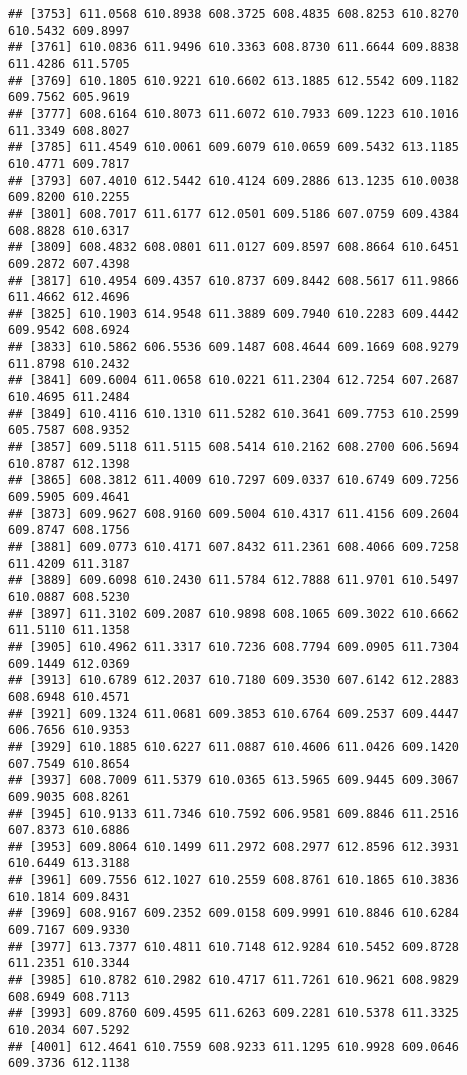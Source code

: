 \documentclass[
]{article}
\begin{document}
\begin{verbatim}
## [3753] 611.0568 610.8938 608.3725 608.4835 608.8253 610.8270 610.5432 609.8997
## [3761] 610.0836 611.9496 610.3363 608.8730 611.6644 609.8838 611.4286 611.5705
## [3769] 610.1805 610.9221 610.6602 613.1885 612.5542 609.1182 609.7562 605.9619
## [3777] 608.6164 610.8073 611.6072 610.7933 609.1223 610.1016 611.3349 608.8027
## [3785] 611.4549 610.0061 609.6079 610.0659 609.5432 613.1185 610.4771 609.7817
## [3793] 607.4010 612.5442 610.4124 609.2886 613.1235 610.0038 609.8200 610.2255
## [3801] 608.7017 611.6177 612.0501 609.5186 607.0759 609.4384 608.8828 610.6317
## [3809] 608.4832 608.0801 611.0127 609.8597 608.8664 610.6451 609.2872 607.4398
## [3817] 610.4954 609.4357 610.8737 609.8442 608.5617 611.9866 611.4662 612.4696
## [3825] 610.1903 614.9548 611.3889 609.7940 610.2283 609.4442 609.9542 608.6924
## [3833] 610.5862 606.5536 609.1487 608.4644 609.1669 608.9279 611.8798 610.2432
## [3841] 609.6004 611.0658 610.0221 611.2304 612.7254 607.2687 610.4695 611.2484
## [3849] 610.4116 610.1310 611.5282 610.3641 609.7753 610.2599 605.7587 608.9352
## [3857] 609.5118 611.5115 608.5414 610.2162 608.2700 606.5694 610.8787 612.1398
## [3865] 608.3812 611.4009 610.7297 609.0337 610.6749 609.7256 609.5905 609.4641
## [3873] 609.9627 608.9160 609.5004 610.4317 611.4156 609.2604 609.8747 608.1756
## [3881] 609.0773 610.4171 607.8432 611.2361 608.4066 609.7258 611.4209 611.3187
## [3889] 609.6098 610.2430 611.5784 612.7888 611.9701 610.5497 610.0887 608.5230
## [3897] 611.3102 609.2087 610.9898 608.1065 609.3022 610.6662 611.5110 611.1358
## [3905] 610.4962 611.3317 610.7236 608.7794 609.0905 611.7304 609.1449 612.0369
## [3913] 610.6789 612.2037 610.7180 609.3530 607.6142 612.2883 608.6948 610.4571
## [3921] 609.1324 611.0681 609.3853 610.6764 609.2537 609.4447 606.7656 610.9353
## [3929] 610.1885 610.6227 611.0887 610.4606 611.0426 609.1420 607.7549 610.8654
## [3937] 608.7009 611.5379 610.0365 613.5965 609.9445 609.3067 609.9035 608.8261
## [3945] 610.9133 611.7346 610.7592 606.9581 609.8846 611.2516 607.8373 610.6886
## [3953] 609.8064 610.1499 611.2972 608.2977 612.8596 612.3931 610.6449 613.3188
## [3961] 609.7556 612.1027 610.2559 608.8761 610.1865 610.3836 610.1814 609.8431
## [3969] 608.9167 609.2352 609.0158 609.9991 610.8846 610.6284 609.7167 609.9330
## [3977] 613.7377 610.4811 610.7148 612.9284 610.5452 609.8728 611.2351 610.3344
## [3985] 610.8782 610.2982 610.4717 611.7261 610.9621 608.9829 608.6949 608.7113
## [3993] 609.8760 609.4595 611.6263 609.2281 610.5378 611.3325 610.2034 607.5292
## [4001] 612.4641 610.7559 608.9233 611.1295 610.9928 609.0646 609.3736 612.1138

\end{verbatim}
\end{document}
